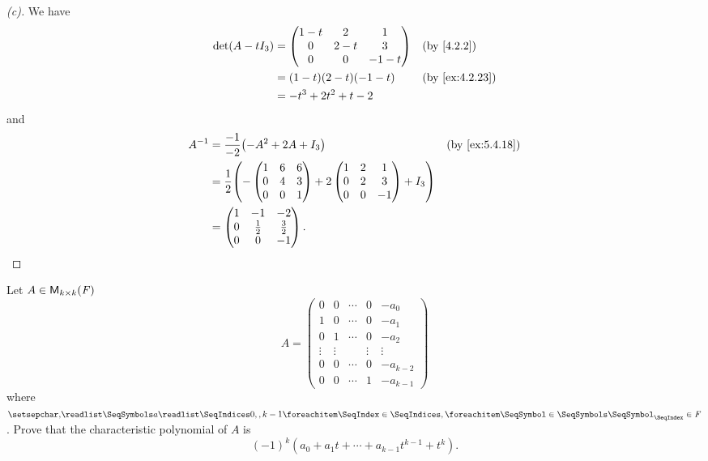 \begin{proof}[(c)]
	We have
	\begin{align*}
		\det(A - t I_3) & = \begin{pmatrix}
			                    1 - t & 2     & 1      \\
			                    0     & 2 - t & 3      \\
			                    0     & 0     & -1 - t
		                    \end{pmatrix} &  & \by{4.2.2}               \\
		                & = (1 - t)(2 - t)(-1 - t)  &  & \by{ex:4.2.23} \\
		                & = -t^3 + 2t^2 + t - 2
	\end{align*}
	and
	\begin{align*}
		A^{-1} & = \frac{-1}{-2} \pa{-A^2 + 2A + I_3} &  & \by{ex:5.4.18} \\
		       & = \frac{1}{2} \pa{-\begin{pmatrix}
				                            1 & 6 & 6 \\
				                            0 & 4 & 3 \\
				                            0 & 0 & 1
			                            \end{pmatrix} + 2\begin{pmatrix}
				                                             1 & 2 & 1  \\
				                                             0 & 2 & 3  \\
				                                             0 & 0 & -1
			                                             \end{pmatrix} + I_3} \\
		       & = \begin{pmatrix}
			           1 & -1          & -2          \\
			           0 & \frac{1}{2} & \frac{3}{2} \\
			           0 & 0           & -1
		           \end{pmatrix}.
	\end{align*}
\end{proof}

\begin{ex}\label{ex:5.4.19}
	Let \(A \in \mathsf{M}_{{k} \times k}({\mathit{F}})\)
	\[
		A = \begin{pmatrix}
			0      & 0      & \cdots & 0      & -a_0       \\
			1      & 0      & \cdots & 0      & -a_1       \\
			0      & 1      & \cdots & 0      & -a_2       \\
			\vdots & \vdots &        & \vdots & \vdots     \\
			0      & 0      & \cdots & 0      & -a_{k - 2} \\
			0      & 0      & \cdots & 1      & -a_{k - 1}
		\end{pmatrix}
	\]
	where \(\seq{a}{0,,k-1} \in \F\).
	Prove that the characteristic polynomial of \(A\) is
	\[
		(-1)^k (a_0 + a_1 t + \cdots + a_{k - 1} t^{k - 1} + t^k).
	\]
\end{ex}

